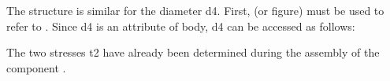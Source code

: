 \documentclass[letterpaper,10pt,english]{sphinxmanual}
\begin{document}
\begin{sphinxVerbatim}[commandchars=\\\{\}]
  \PYG{p}{[}\PYG{p}{]}
\end{sphinxVerbatim}

\sphinxAtStartPar
The structure is similar for the diameter d4. First,  (or figure) must be used to refer to . Since d4 is an
attribute of body, d4 can be accessed as follows:

\begin{sphinxVerbatim}[commandchars=\\\{\}]
  
\end{sphinxVerbatim}

\sphinxAtStartPar
The two stresses t2 have already been determined during the assembly of the component .
\end{document}
